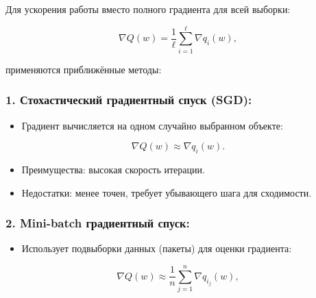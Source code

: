 Для ускорения работы вместо полного градиента для всей выборки:

\begin{equation}
\nabla Q(w) = \frac{1}{\ell} \sum_{i=1}^\ell \nabla q_i(w),
\end{equation}

применяются приближённые методы:

\hypertarget{ux441ux442ux43eux445ux430ux441ux442ux438ux447ux435ux441ux43aux438ux439-ux433ux440ux430ux434ux438ux435ux43dux442ux43dux44bux439-ux441ux43fux443ux441ux43a-sgd}{%
\subsubsection*{1. Стохастический градиентный спуск
(SGD):}\label{ux441ux442ux43eux445ux430ux441ux442ux438ux447ux435ux441ux43aux438ux439-ux433ux440ux430ux434ux438ux435ux43dux442ux43dux44bux439-ux441ux43fux443ux441ux43a-sgd}}

\begin{itemize}
\tightlist
\item
  Градиент вычисляется на одном случайно выбранном объекте:
\end{itemize}

\begin{equation}
\nabla Q(w) \approx \nabla q_i(w).
\end{equation}

\begin{itemize}
\tightlist
\item
  Преимущества: высокая скорость итерации.
\item
  Недостатки: менее точен, требует убывающего шага для
  сходимости.
\end{itemize}

\hypertarget{mini-batch-ux433ux440ux430ux434ux438ux435ux43dux442ux43dux44bux439-ux441ux43fux443ux441ux43a}{%
\subsubsection*{2. Mini-batch градиентный
спуск:}\label{mini-batch-ux433ux440ux430ux434ux438ux435ux43dux442ux43dux44bux439-ux441ux43fux443ux441ux43a}}

\begin{itemize}
\tightlist
\item
  Использует подвыборки данных (пакеты) для оценки градиента:
\end{itemize}

\begin{equation}
\nabla Q(w) \approx \frac{1}{n} \sum_{j=1}^n \nabla q_{i_j}(w),
\end{equation}

